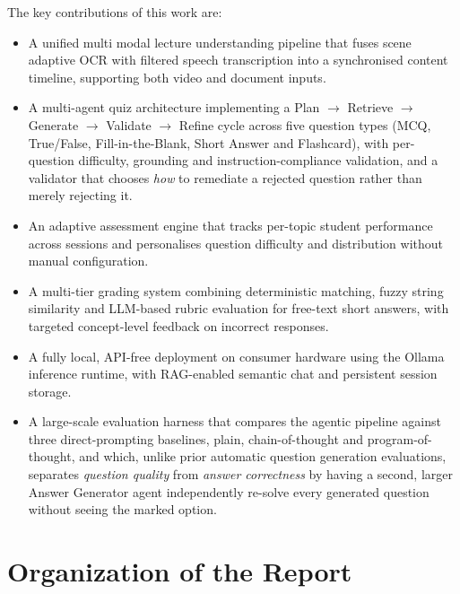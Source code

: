 The key contributions of this work are:

\begin{itemize}
  \item A unified multi modal lecture understanding pipeline that fuses
        scene adaptive OCR with filtered speech transcription into a synchronised
        content timeline, supporting both video and document inputs.

  \item A multi-agent quiz architecture implementing a Plan $\rightarrow$ Retrieve
        $\rightarrow$ Generate $\rightarrow$ Validate $\rightarrow$ Refine cycle
        across five question types (MCQ, True/False, Fill-in-the-Blank, Short Answer
        and Flashcard), with per-question difficulty, grounding and
        instruction-compliance validation, and a validator that chooses \emph{how}
        to remediate a rejected question rather than merely rejecting it.

  \item An adaptive assessment engine that tracks per-topic student performance
        across sessions and personalises question difficulty and distribution
        without manual configuration.

  \item A multi-tier grading system combining deterministic matching, fuzzy string
        similarity and LLM-based rubric evaluation for free-text short answers, with
        targeted concept-level feedback on incorrect responses.

  \item A fully local, API-free deployment on consumer hardware using the Ollama
        inference runtime, with RAG-enabled semantic chat and persistent session
        storage.

  \item A large-scale evaluation harness that compares the agentic pipeline against
        three direct-prompting baselines, plain, chain-of-thought and
        program-of-thought, and which, unlike prior automatic question generation
        evaluations, separates \emph{question quality} from \emph{answer
        correctness} by having a second, larger Answer Generator agent independently
        re-solve every generated question without seeing the marked option.
\end{itemize}

\section{Organization of the Report}
\label{sec:intro-org}

